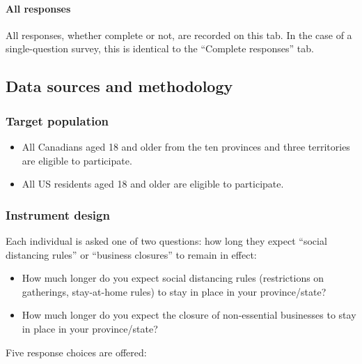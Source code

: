 \documentclass[
]{article}
\providecommand{\tightlist}{%
  \setlength{\itemsep}{0pt}\setlength{\parskip}{0pt}}
\begin{document}
\hypertarget{all-responses}{%
\paragraph{All responses}\label{all-responses}}

All responses, whether complete or not, are recorded on this tab. In the
case of a single-question survey, this is identical to the ``Complete
responses'' tab.

\hypertarget{data-sources-and-methodology}{%
\subsection{Data sources and
methodology}\label{data-sources-and-methodology}}

\hypertarget{target-population}{%
\subsubsection{Target population}\label{target-population}}

\begin{itemize}
\tightlist
\item
  All Canadians aged 18 and older from the ten provinces and three
  territories are eligible to participate.
\item
  All US residents aged 18 and older are eligible to participate.
\end{itemize}

\hypertarget{instrument-design}{%
\subsubsection{Instrument design}\label{instrument-design}}

Each individual is asked one of two questions: how long they expect
``social distancing rules'' or ``business closures'' to remain in
effect:

\begin{itemize}
\tightlist
\item
  How much longer do you expect social distancing rules (restrictions on
  gatherings, stay-at-home rules) to stay in place in your
  province/state?
\item
  How much longer do you expect the closure of non-essential businesses
  to stay in place in your province/state?
\end{itemize}

Five response choices are offered:
\end{document}
